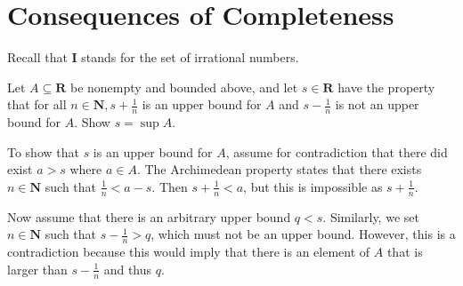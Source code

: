 \section{Consequences of Completeness}

\begin{exercise}
  Recall that $\mathbf{I}$ stands for the set of irrational numbers.
\end{exercise}

\begin{solution}
\end{solution}


\begin{exercise}
  Let $A \subseteq \mathbf{R}$ be nonempty and bounded above, and let $s \in \mathbf{R}$ have the property that for all $n \in \mathbf{N}, s+\frac{1}{n}$ is an upper bound for $A$ and $s-\frac{1}{n}$ is not an upper bound for $A$. Show $s=\sup A$.
\end{exercise}

\begin{solution}
  To show that $s$ is an upper bound for $A$, assume for contradiction that there did exist $a > s$ where $a\in A$. The Archimedean property states that there exists $n\in\mathbf{N}$ such that $\frac{1}{n} < a - s$. Then $s + \frac{1}{n} < a$, but this is impossible as $s+\frac{1}{n}$.

  Now assume that there is an arbitrary upper bound $q < s$. Similarly, we set $n\in\mathbf{N}$ such that $s-\frac{1}{n}>q$, which must not be an upper bound. However, this is a contradiction because this would imply that there is an element of $A$ that is larger than $s-\frac{1}{n}$ and thus $q$.
\end{solution}



